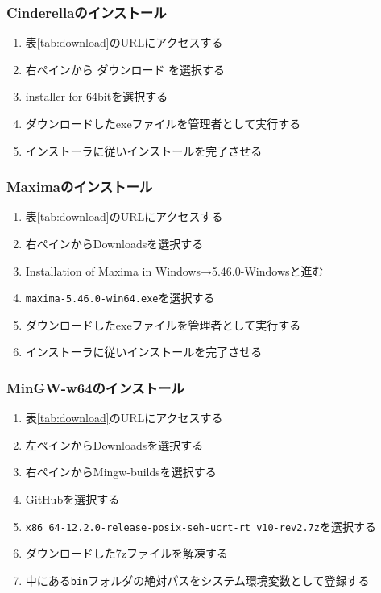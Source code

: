 \subsubsection{Cinderellaのインストール}
\begin{enumerate}
    \item 表\ref{tab:download}のURLにアクセスする
    \item 右ペインから ダウンロード を選択する
    \item installer for 64bitを選択する
    \item ダウンロードしたexeファイルを管理者として実行する
    \item インストーラに従いインストールを完了させる
\end{enumerate}

\newpage

\subsubsection{Maximaのインストール}
\begin{enumerate}
    \item 表\ref{tab:download}のURLにアクセスする
    \item 右ペインからDownloadsを選択する
    \item Installation of Maxima in Windows→5.46.0-Windowsと進む
    \item \verb|maxima-5.46.0-win64.exe|を選択する
    \item ダウンロードしたexeファイルを管理者として実行する
    \item インストーラに従いインストールを完了させる
\end{enumerate}

\subsubsection{MinGW-w64のインストール}
\begin{enumerate}
    \item 表\ref{tab:download}のURLにアクセスする
    \item 左ペインからDownloadsを選択する
    \item 右ペインからMingw-buildsを選択する
    \item GitHubを選択する
    \item \verb|x86_64-12.2.0-release-posix-seh-ucrt-rt_v10-rev2.7z|を選択する
    \item ダウンロードした7zファイルを解凍する
    \item 中にある\verb|bin|フォルダの絶対パスをシステム環境変数として登録する
\end{enumerate}


